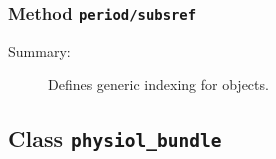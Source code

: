 \subsubsection[Method \texttt{subsref}]{Method \texttt{period/subsref}}%
%
\label{ref_period__subsref}%
\hypertarget{ref_period__subsref}{}%
\begin{description}
\item[Summary:]Defines generic indexing for objects.
%
%
%
%
%
%
%
%
\end{description}
\methodline%
\subsection{Class \texttt{physiol\_bundle}}%
%
\label{ref_physiol_bundle}%
\hypertarget{ref_physiol_bundle}{}%
